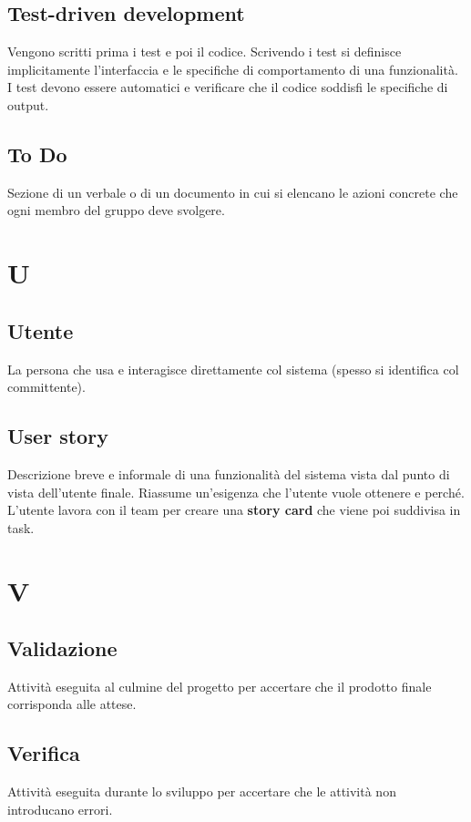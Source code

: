 \documentclass[a4paper,12pt]{article}
\begin{document}
\subsection{Test-driven development}
Vengono scritti prima i test e poi il codice. Scrivendo i test si definisce implicitamente l’interfaccia e le specifiche di comportamento di una funzionalità.  
I test devono essere automatici e verificare che il codice soddisfi le specifiche di output.

\subsection{To Do}
Sezione di un verbale o di un documento in cui si elencano le azioni concrete che ogni membro del gruppo deve svolgere.

\section{U}

\subsection{Utente}
La persona che usa e interagisce direttamente col sistema (spesso si identifica col committente).

\subsection{User story}
Descrizione breve e informale di una funzionalità del sistema vista dal punto di vista dell’utente finale.  
Riassume un’esigenza che l’utente vuole ottenere e perché.  
L’utente lavora con il team per creare una \textbf{story card} che viene poi suddivisa in task.

\section{V}

\subsection{Validazione}
Attività eseguita al culmine del progetto per accertare che il prodotto finale corrisponda alle attese.

\subsection{Verifica}
Attività eseguita durante lo sviluppo per accertare che le attività non introducano errori.
\end{document}
